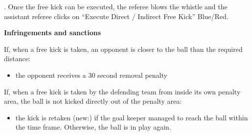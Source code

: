 . Once the free kick can be executed, the referee blows the whistle and the assistant referee clicks on ``Execute Direct / Indirect Free Kick'' Blue/Red. 

\bigskip

{\bfseries Infringements and sanctions}

\headlinebox

If, when a free kick is taken, an opponent is closer to the ball than the required distance:

\begin{itemize}
\item the opponent receives a 30 second removal penalty 
\end{itemize}

If, when a free kick is taken by the defending team from inside its own penalty area, the ball is not kicked directly out of the penalty area:


\begin{itemize}
\item the kick is retaken (new:) if the goal keeper managed to reach the ball within the time frame. Otherwise, the ball is in play again.
\end{itemize}

\bigskip

